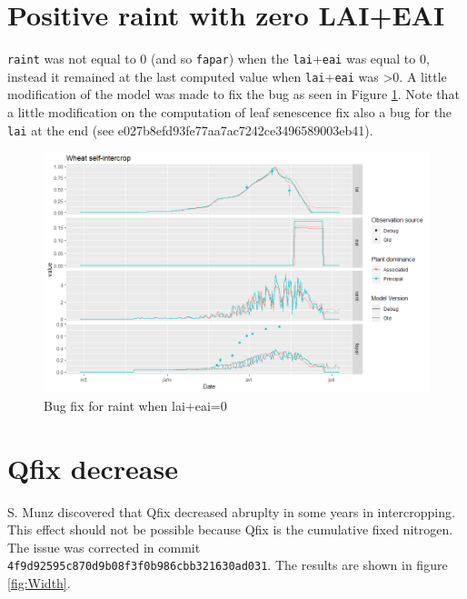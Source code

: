 \documentclass[
]{book}
\begin{document}
\hypertarget{positive-raint-with-zero-laieai}{%
\section{Positive raint with zero LAI+EAI}\label{positive-raint-with-zero-laieai}}

\texttt{raint} was not equal to 0 (and so \texttt{fapar}) when the \texttt{lai}+\texttt{eai} was equal to 0, instead it remained at the last computed value when \texttt{lai}+\texttt{eai} was \textgreater0. A little modification of the model was made to fix the bug as seen in Figure \ref{fig:bugraint}. Note that a little modification on the computation of leaf senescence fix also a bug for the \texttt{lai} at the end (see e027b8efd93fe77aa7ac7242ce3496589003eb41).

\begin{figure}
\centering
\includegraphics{img/raintbug.png}
\caption{\label{fig:bugraint}Bug fix for raint when lai+eai=0}
\end{figure}

\hypertarget{qfix-decrease}{%
\section{Qfix decrease}\label{qfix-decrease}}

S. Munz discovered that Qfix decreased abruplty in some years in intercropping. This effect should not be possible because Qfix is the cumulative fixed nitrogen.
The issue was corrected in commit \texttt{4f9d92595c870d9b08f3f0b986cbb321630ad031}. The results are shown in figure \ref{fig:Width}.
\end{document}
